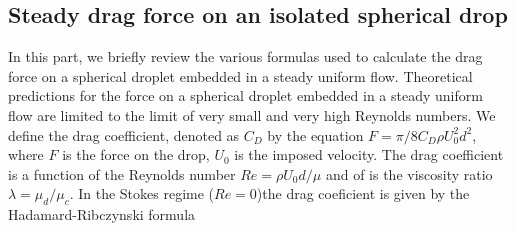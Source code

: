 \subsection{Steady drag force on an isolated spherical drop}

In this part, we briefly review the various formulas used to calculate the drag force on a spherical droplet embedded in a steady uniform flow.  Theoretical predictions for the force on a spherical droplet embedded in a steady uniform flow are limited to the limit of very small and very high Reynolds numbers. We define the drag coefficient, denoted as $C_D$ by the equation $F = \pi / 8 C_D \rho U_0^2 d^2$, where $F$ is the force on the drop, $U_0$ is the imposed velocity. The drag coefficient is a function of the Reynolds number $Re = \rho U_0 d /\mu $ and of is the viscosity ratio$\lambda = \mu _d /\mu _c$. %
In the Stokes regime ($Re=0$)the drag coeficient is given by the Hadamard-Ribczynski formula




